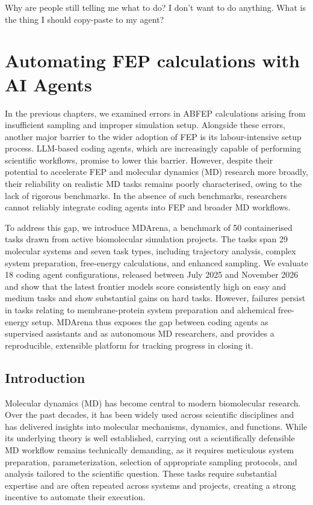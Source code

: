 \begin{savequote}[75mm]
Why are people still telling me what to do? I don't want to do anything. What is the thing I should copy-paste to my agent? 
\end{savequote}

\chapter{Automating FEP calculations with AI Agents}
\label{ch:automating-abfes-with-ai-agents}
In the previous chapters, we examined errors in ABFEP calculations arising from insufficient sampling and improper simulation setup. Alongside these errors, another major barrier to the wider adoption of FEP is its labour-intensive setup process. LLM-based coding agents, which are increasingly capable of performing scientific workflows, promise to lower this barrier. However, despite their potential to accelerate FEP and molecular dynamics (MD) research more broadly, their reliability on realistic MD tasks remains poorly characterised, owing to the lack of rigorous benchmarks. In the absence of such benchmarks, researchers cannot reliably integrate coding agents into FEP and broader MD workflows.

To address this gap, we introduce MDArena, a benchmark of 50 containerised tasks drawn from active biomolecular simulation projects. The tasks span 29 molecular systems and seven task types, including trajectory analysis, complex system preparation, free-energy calculations, and enhanced sampling. We evaluate 18 coding agent configurations, released between July 2025 and November 2026 and show that the latest frontier models score consistently high on easy and medium tasks and show substantial gains on hard tasks. However, failures persist in tasks relating to membrane-protein system preparation and alchemical free-energy setup. MDArena thus exposes the gap between coding agents as supervised assistants and as autonomous MD researchers, and provides a reproducible, extensible platform for tracking progress in closing it.



\section{Introduction}

Molecular dynamics (MD) has become central to modern biomolecular research. Over the past decades, it has been widely used across scientific disciplines and has delivered insights into molecular mechanisms, dynamics, and functions.\cite{hollingsworth2018molecular,huggins2019biomolecular} While its underlying theory is well established, carrying out a scientifically defensible MD workflow remains technically demanding, as it requires meticulous system preparation, parameterization, selection of appropriate sampling protocols, and analysis tailored to the scientific question. These tasks require substantial expertise and are often repeated across systems and projects, creating a strong incentive to automate their execution.

